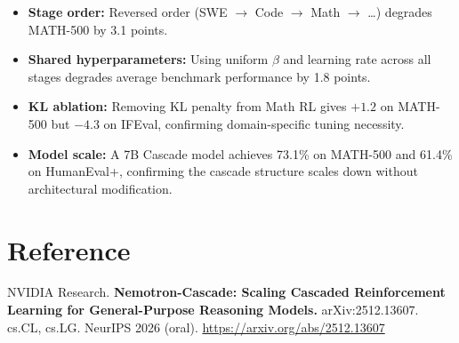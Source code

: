 \documentclass[10pt,twocolumn]{article}
\begin{document}
\begin{itemize}[leftmargin=1em,itemsep=2pt]
  \item \textbf{Stage order:} Reversed order (SWE $\rightarrow$ Code $\rightarrow$ Math $\rightarrow$ \ldots) degrades MATH-500 by 3.1 points.
  \item \textbf{Shared hyperparameters:} Using uniform $\beta$ and learning rate across all stages degrades average benchmark performance by 1.8 points.
  \item \textbf{KL ablation:} Removing KL penalty from Math RL gives $+1.2$ on MATH-500 but $-4.3$ on IFEval, confirming domain-specific tuning necessity.
  \item \textbf{Model scale:} A 7B Cascade model achieves 73.1\% on MATH-500 and 61.4\% on HumanEval+, confirming the cascade structure scales down without architectural modification.
\end{itemize}

\section*{Reference}
NVIDIA Research.
\textbf{Nemotron-Cascade: Scaling Cascaded Reinforcement Learning for General-Purpose Reasoning Models.}
arXiv:2512.13607. cs.CL, cs.LG. NeurIPS 2026 (oral).
\url{https://arxiv.org/abs/2512.13607}
\end{document}

